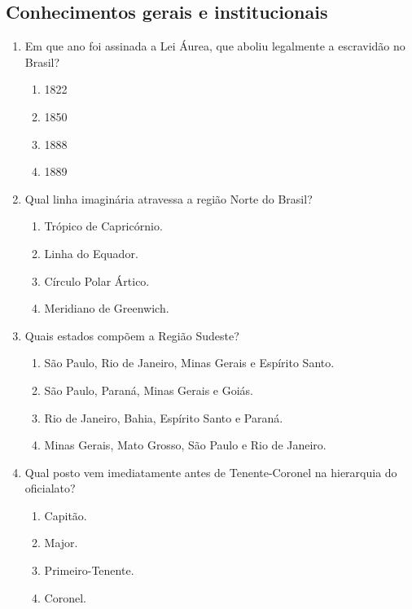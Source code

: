 \documentclass[12pt,a4paper]{article}
\begin{document}
\subsection*{Conhecimentos gerais e institucionais}
\begin{enumerate}[resume]
  \item Em que ano foi assinada a Lei Áurea, que aboliu legalmente a escravidão no Brasil?
  \begin{enumerate}[label=\alph*)]
    \item 1822
    \item 1850
    \item 1888
    \item 1889
  \end{enumerate}

  \item Qual linha imaginária atravessa a região Norte do Brasil?
  \begin{enumerate}[label=\alph*)]
    \item Trópico de Capricórnio.
    \item Linha do Equador.
    \item Círculo Polar Ártico.
    \item Meridiano de Greenwich.
  \end{enumerate}

  \item Quais estados compõem a Região Sudeste?
  \begin{enumerate}[label=\alph*)]
    \item São Paulo, Rio de Janeiro, Minas Gerais e Espírito Santo.
    \item São Paulo, Paraná, Minas Gerais e Goiás.
    \item Rio de Janeiro, Bahia, Espírito Santo e Paraná.
    \item Minas Gerais, Mato Grosso, São Paulo e Rio de Janeiro.
  \end{enumerate}

  \item Qual posto vem imediatamente antes de Tenente-Coronel na hierarquia do oficialato?
  \begin{enumerate}[label=\alph*)]
    \item Capitão.
    \item Major.
    \item Primeiro-Tenente.
    \item Coronel.
  \end{enumerate}
\end{enumerate}
\end{document}
